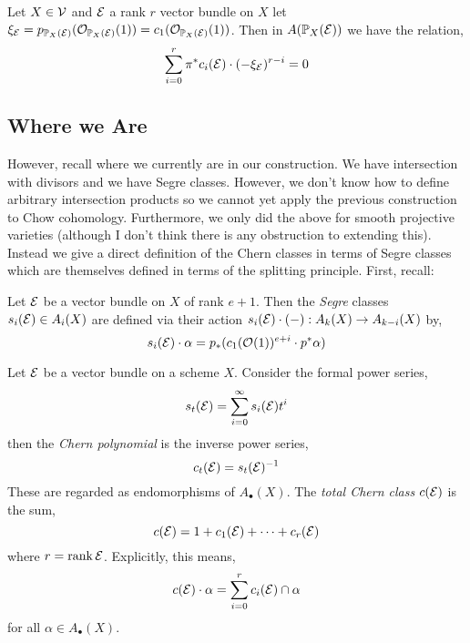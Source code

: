 \documentclass[12pt]{article}
\begin{document}
\begin{lemma}
Let $X \in \mathcal{V}$ and $\mathcal{E}$ a rank $r$ vector bundle on $X$ let $\xi_{\mathcal{E}} = p_{\mathbb{P}_X(\mathcal{E})}(\mathcal{O}_{\mathbb{P}_X(\mathcal{E})}(1)) = c_1(\mathcal{O}_{\mathbb{P}_X(\mathcal{E})}(1))$. Then in $A(\mathbb{P}_X(\mathcal{E}))$ we have the relation,
\[ \sum_{i = 0}^r \pi^* c_i(\mathcal{E}) \cdot (-\xi_{\mathcal{E}})^{r-i} = 0 \] 
\end{lemma}

\subsection{Where we Are}

However, recall where we currently are in our construction. We have intersection with divisors and we have Segre classes. However, we don't know how to define arbitrary intersection products so we cannot yet apply the previous construction to Chow cohomology. Furthermore, we only did the above for smooth projective varieties (although I don't think there is any obstruction to extending this). Instead we give a direct definition of the Chern classes in terms of Segre classes which are themselves defined in terms of the splitting principle. First, recall:

\begin{defn}
Let $\mathcal{E}$ be a vector bundle on $X$ of rank $e+1$. Then the \textit{Segre} classes $s_i(\mathcal{E}) \in A_i(X)$ are defined via their action $s_i(\mathcal{E}) \cdot (-) : A_k(X) \to A_{k-i}(X)$ by,
\[ s_i(\mathcal{E}) \cdot \alpha = p_* (c_1(\mathcal{O}_{}(1))^{e+i} \cdot p^* \alpha) \]
\end{defn}

\begin{defn}
Let $\mathcal{E}$ be a vector bundle on a scheme $X$. Consider the formal power series,
\[ s_t(\mathcal{E}) = \sum_{i = 0}^\infty s_i(\mathcal{E}) t^i \]
then the \textit{Chern polynomial} is the inverse power series,
\[ c_t(\mathcal{E}) = s_t(\mathcal{E})^{-1} \]
These are regarded as endomorphisms of $A_\bullet(X)$. The \textit{total Chern class} $c(\mathcal{E})$ is the sum,
\[ c(\mathcal{E}) = 1 + c_1(\mathcal{E}) + \cdots + c_r(\mathcal{E}) \]
where $r = \operatorname{\mathrm{rank}}{\mathcal{E}}$. Explicitly, this means,
\[ c(\mathcal{E}) \cdot \alpha = \sum_{i = 0}^r c_i(\mathcal{E}) \cap \alpha \]
for all $\alpha \in A_\bullet(X)$.
\end{defn}
\end{document}
